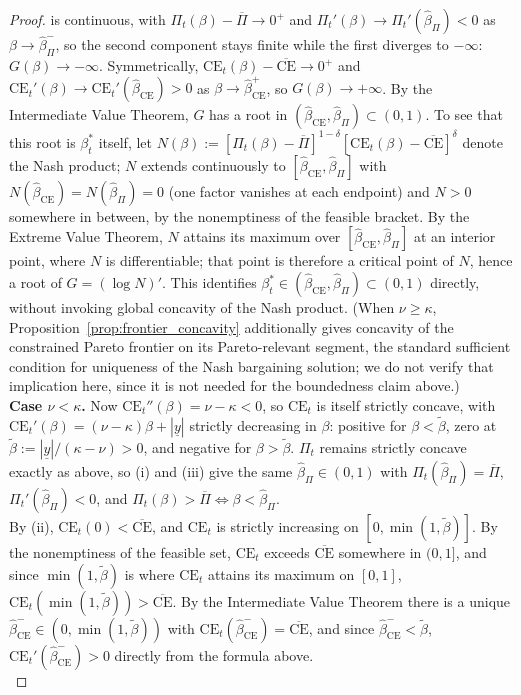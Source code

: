 \documentclass{article}
\theoremstyle{definition}
\theoremstyle{plain}
\begin{document}
\begin{appendices}
\begin{proof}
is continuous, with $\Pi_t(\beta)-\overline\Pi\to0^+$ and $\Pi_t'(\beta)\to\Pi_t'(\widehat\beta_\Pi)<0$ as $\beta\to\widehat\beta_\Pi^-$, so the second component stays finite while the first diverges to $-\infty$: $G(\beta)\to-\infty$. Symmetrically, $\text{CE}_t(\beta)-\overline{\text{CE}}\to0^+$ and $\text{CE}_t'(\beta)\to\text{CE}_t'(\widehat\beta_{\mathrm{CE}})>0$ as $\beta\to\widehat\beta_{\mathrm{CE}}^+$, so $G(\beta)\to+\infty$. By the Intermediate Value Theorem, $G$ has a root in $(\widehat\beta_{\mathrm{CE}},\widehat\beta_\Pi)\subset(0,1)$. To see that this root is $\beta_t^*$ itself, let $N(\beta):=[\Pi_t(\beta)-\overline\Pi]^{1-\delta}[\text{CE}_t(\beta)-\overline{\text{CE}}]^{\delta}$ denote the Nash product; $N$ extends continuously to $[\widehat\beta_{\mathrm{CE}},\widehat\beta_\Pi]$ with $N(\widehat\beta_{\mathrm{CE}})=N(\widehat\beta_\Pi)=0$ (one factor vanishes at each endpoint) and $N>0$ somewhere in between, by the nonemptiness of the feasible bracket. By the Extreme Value Theorem, $N$ attains its maximum over $[\widehat\beta_{\mathrm{CE}},\widehat\beta_\Pi]$ at an interior point, where $N$ is differentiable; that point is therefore a critical point of $N$, hence a root of $G=(\log N)'$. This identifies $\beta_t^*\in(\widehat\beta_{\mathrm{CE}},\widehat\beta_\Pi)\subset(0,1)$ directly, without invoking global concavity of the Nash product. (When $\nu\ge\kappa$, Proposition~\ref{prop:frontier_concavity} additionally gives concavity of the constrained Pareto frontier on its Pareto-relevant segment, the standard sufficient condition for uniqueness of the Nash bargaining solution; we do not verify that implication here, since it is not needed for the boundedness claim above.)\\
\textbf{Case $\nu<\kappa$.} Now $\text{CE}_t''(\beta)=\nu-\kappa<0$, so $\text{CE}_t$ is itself strictly concave, with $\text{CE}_t'(\beta)=(\nu-\kappa)\beta+|\underline y|$ strictly decreasing in $\beta$: positive for $\beta<\tilde\beta$, zero at $\tilde\beta:=|\underline y|/(\kappa-\nu)>0$, and negative for $\beta>\tilde\beta$. $\Pi_t$ remains strictly concave exactly as above, so (i) and (iii) give the same $\widehat\beta_\Pi\in(0,1)$ with $\Pi_t(\widehat\beta_\Pi)=\overline\Pi$, $\Pi_t'(\widehat\beta_\Pi)<0$, and $\Pi_t(\beta)>\overline\Pi \iff \beta<\widehat\beta_\Pi$.\\
By (ii), $\text{CE}_t(0)<\overline{\text{CE}}$, and $\text{CE}_t$ is strictly increasing on $[0,\min(1,\tilde\beta)]$. By the nonemptiness of the feasible set, $\text{CE}_t$ exceeds $\overline{\text{CE}}$ somewhere in $(0,1]$, and since $\min(1,\tilde\beta)$ is where $\text{CE}_t$ attains its maximum on $[0,1]$, $\text{CE}_t(\min(1,\tilde\beta))>\overline{\text{CE}}$. By the Intermediate Value Theorem there is a unique $\widehat\beta_{\mathrm{CE}}^{-}\in(0,\min(1,\tilde\beta))$ with $\text{CE}_t(\widehat\beta_{\mathrm{CE}}^{-})=\overline{\text{CE}}$, and since $\widehat\beta_{\mathrm{CE}}^{-}<\tilde\beta$, $\text{CE}_t'(\widehat\beta_{\mathrm{CE}}^{-})>0$ directly from the formula above.\\

\end{proof}
\end{appendices}
\end{document}
